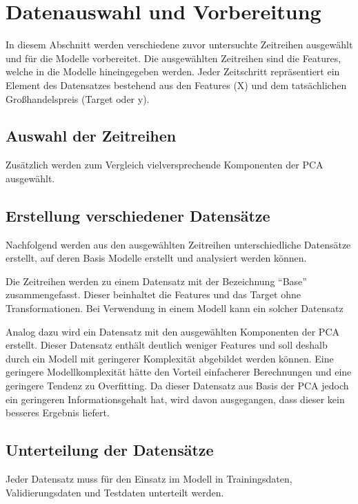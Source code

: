 \section{Datenauswahl und Vorbereitung}
In diesem Abschnitt werden verschiedene zuvor untersuchte Zeitreihen ausgewählt und für die Modelle vorbereitet. Die ausgewählten Zeitreihen sind die Features, welche in die Modelle hineingegeben werden. Jeder Zeitschritt repräsentiert ein Element des Datensatzes bestehend aus den Features (X) und dem tatsächlichen Großhandelspreis (Target oder y).

\subsection{Auswahl der Zeitreihen}

Zusätzlich werden zum Vergleich vielversprechende Komponenten der PCA ausgewählt. 

\subsection{Erstellung verschiedener Datensätze}
Nachfolgend werden aus den ausgewählten Zeitreihen unterschiedliche Datensätze erstellt, auf deren Basis Modelle erstellt und analysiert werden können.

Die Zeitreihen werden zu einem Datensatz mit der Bezeichnung ``Base'' zusammengefasst. Dieser beinhaltet die Features und das Target ohne Transformationen. Bei Verwendung in einem Modell kann ein solcher Datensatz   

Analog dazu wird ein Datensatz mit den ausgewählten Komponenten der PCA erstellt. Dieser Datensatz enthält deutlich weniger Features und soll deshalb durch ein Modell mit geringerer Komplexität abgebildet werden können. Eine geringere Modellkomplexität hätte den Vorteil einfacherer Berechnungen und eine geringere Tendenz zu Overfitting. Da dieser Datensatz aus Basis der PCA jedoch ein geringeren Informationsgehalt hat, wird davon ausgegangen, dass dieser kein besseres Ergebnis liefert.

\subsection{Unterteilung der Datensätze}
Jeder Datensatz muss für den Einsatz im Modell in Trainingsdaten, Validierungsdaten und Testdaten unterteilt werden. 

